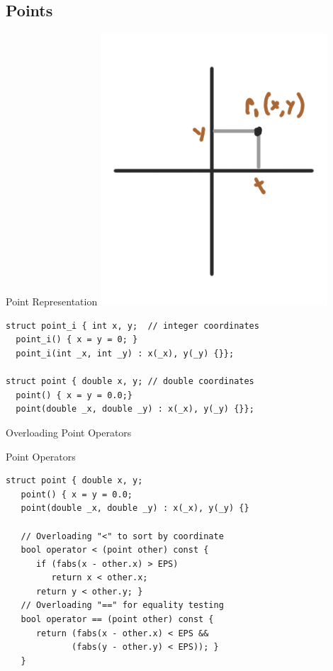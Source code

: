 \subsection{Points}
\begin{frame}[fragile]{Point Representation}
    \includegraphics[width=.2\textwidth]{../img/geom2}
    \begin{exampleblock}{}
\begin{verbatim}
struct point_i { int x, y;  // integer coordinates
  point_i() { x = y = 0; }
  point_i(int _x, int _y) : x(_x), y(_y) {}};

struct point { double x, y; // double coordinates
  point() { x = y = 0.0;}
  point(double _x, double _y) : x(_x), y(_y) {}};
\end{verbatim}
    \end{exampleblock}
\end{frame}

\begin{frame}[fragile]{Overloading Point Operators}

    \begin{exampleblock}{Point Operators}
\begin{verbatim}
struct point { double x, y;
   point() { x = y = 0.0;
   point(double _x, double _y) : x(_x), y(_y) {}

   // Overloading "<" to sort by coordinate
   bool operator < (point other) const {
      if (fabs(x - other.x) > EPS)
         return x < other.x;
      return y < other.y; }
   // Overloading "==" for equality testing
   bool operator == (point other) const {
      return (fabs(x - other.x) < EPS &&
             (fabs(y - other.y) < EPS)); }
   }
\end{verbatim}
    \end{exampleblock}
\end{frame}

